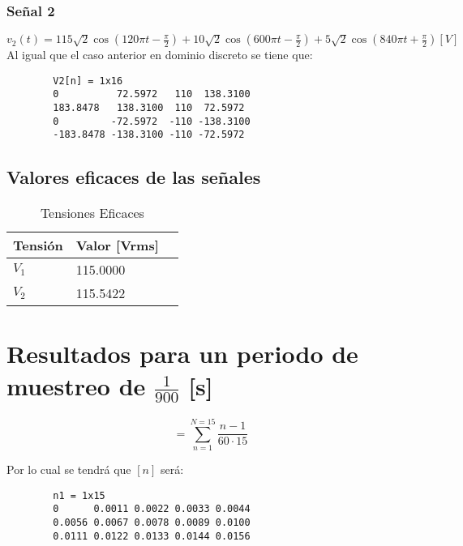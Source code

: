 \documentclass[conference]{IEEEtran}
\theoremstyle{mytheoremstyle}
\theoremstyle{mytheoremstyle}
\theoremstyle{myproblemstyle}
\begin{document}
        \subsubsection{Señal 2}
        $v_2(t) = 115\sqrt{2} \cos(120 \pi t - \frac{\pi}{2}) + 10 \sqrt{2} \cos(600 \pi t - \frac{\pi}{2}) + 5 \sqrt{2} \cos(840 \pi t + \frac{\pi}{2}) [V]$
        \\ Al igual que el caso anterior en dominio discreto se tiene que:  
        
        \begin{verbatim}
        V2[n] = 1x16    
        0          72.5972   110  138.3100  
        183.8478   138.3100  110  72.5972    
        0         -72.5972  -110 -138.3100
        -183.8478 -138.3100 -110 -72.5972
        \end{verbatim}

        \subsection{Valores eficaces de las señales}
        \begin{table}[h]
        \centering
        \caption{Tensiones Eficaces}
        \begin{tabular}{@{}lll@{}}
            \toprule
            Tensión & Valor [Vrms] \\ \midrule
            $V_1$   & 115.0000     \\
            $V_2$   & 115.5422     \\ \bottomrule
        \end{tabular}
        \label{tab:tensiones}
        \end{table}

        \section{Resultados para un periodo de muestreo de \texorpdfstring{$\frac{1}{900}$}{1/900} [s]}
        \begin{equation}
        [n] = \sum_{n=1}^{N=15} \frac{n-1}{60 \cdot 15}
        \end{equation}

        Por lo cual se tendrá que $[n]$ será:

    \begin{verbatim}
        n1 = 1x15    
        0      0.0011 0.0022 0.0033 0.0044    
        0.0056 0.0067 0.0078 0.0089 0.0100    
        0.0111 0.0122 0.0133 0.0144 0.0156
    \end{verbatim}
\end{document}

